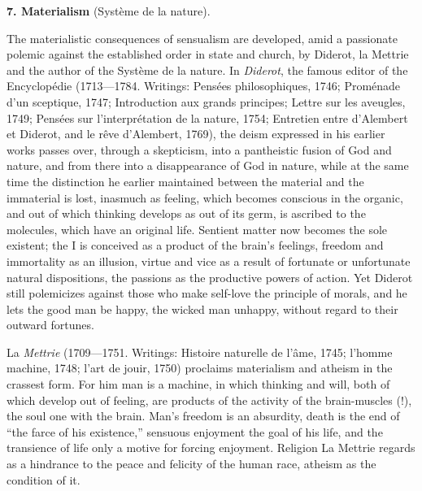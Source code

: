\divrule

\begin{center}
  \textbf{7. Materialism} (Système de la nature).
\end{center}

The materialistic consequences of sensualism are developed, amid a
passionate polemic against the established order in state and church,
by Diderot, la Mettrie and the author of the Système de la nature. In
\emph{Diderot}, the famous editor of the Encyclopédie (1713---1784.
Writings: Pensées philosophiques, 1746;
Proménade d'un sceptique, 1747; Introduction aux grands principes;
Lettre sur les aveugles, 1749; Pensées sur l'interprétation de la
nature, 1754; Entretien entre d'Alembert et Diderot, and le rêve
d'Alembert, 1769), the deism expressed in his earlier works passes
over, through a skepticism, into a pantheistic fusion of God and
nature, and from there into a disappearance of God in nature, while at
the same time the distinction he earlier maintained between the
material and the immaterial is lost, inasmuch as feeling, which becomes
conscious in the organic, and out of which thinking develops as out of
its germ, is ascribed to the molecules, which have an original life.
Sentient matter now becomes the sole existent; the I is conceived as a
product of the brain's feelings, freedom and immortality as an
illusion, virtue and vice as a result of fortunate or unfortunate
natural dispositions, the passions as the productive powers of action.
Yet Diderot still polemicizes against those who make
self-love the principle of morals, and he lets the good man be happy,
the wicked man unhappy, without regard to their outward fortunes.

La \emph{Mettrie} (1709---1751. Writings: Histoire naturelle de
l'âme, 1745; l'homme machine, 1748; l'art de jouir, 1750) proclaims
materialism and atheism in the crassest form. For him man is a
machine, in which thinking and will, both of which develop out of
feeling, are products of the activity of the brain-muscles (!), the
soul one with the brain. Man's freedom is an absurdity, death is the
end of ``the farce of his existence,'' sensuous enjoyment the goal of
his life, and the transience of life only a motive for forcing
enjoyment. Religion La Mettrie regards as a hindrance to the peace and
felicity of the human race, atheism as the condition of it.

